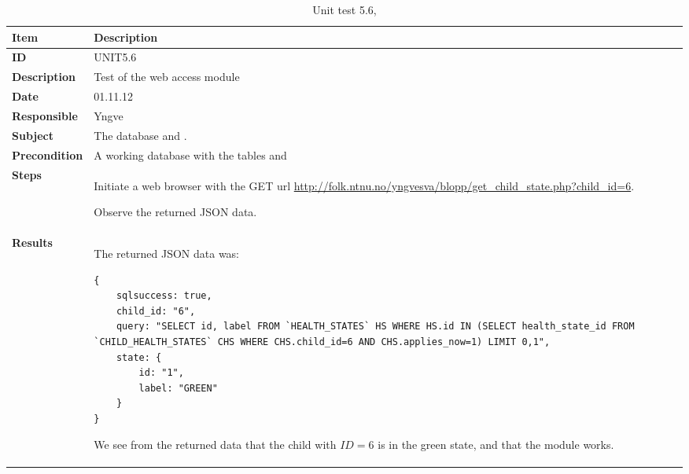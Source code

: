 \begin{table} %
	\begin{center}
		\begin{tabular}{|p{3.0cm}|p{14.0cm}|}
			\hline
			\bf{Item} & \bf{Description}\\
			\hline
			\bf{ID} & UNIT5.6\\
			\bf{Description} & Test of the web access module \code{get\_child\_state.php}\\
			\bf{Date} & 01.11.12\\
			\bf{Responsible} & Yngve\\
			\bf{Subject} & The database and \code{get\_child\_state.php}.\\
			\bf{Precondition} & A working database with the tables \code{HEALTH\_STATES} and \code{CHILD\_HEALTH\_STATES}\\
			\bf{Steps} &
			\begin{tabulenum}
				\item Initiate a web browser with the GET url \url{http://folk.ntnu.no/yngvesva/blopp/get\_child\_state.php?child\_id=6}.
				\item Observe the returned JSON data.
			\end{tabulenum}\\
			\hline
			\bf{Results} & The returned JSON data was:
\begin{lstlisting}[caption=Returned JSON data from \code{get\_child\_state.php}]
{
	sqlsuccess: true,
	child_id: "6",
	query: "SELECT id, label FROM `HEALTH_STATES` HS WHERE HS.id IN (SELECT health_state_id FROM `CHILD_HEALTH_STATES` CHS WHERE CHS.child_id=6 AND CHS.applies_now=1) LIMIT 0,1",
	state: {
		id: "1",
		label: "GREEN"
	}
}
\end{lstlisting}
			We see from the returned data that the child with $ID=6$ is in the green state, and that the module works.\\
			\hline
		\end{tabular}
	\end{center}
	\caption{Unit test 5.6, }
	\label{tab:unit5.6}
\end{table}

